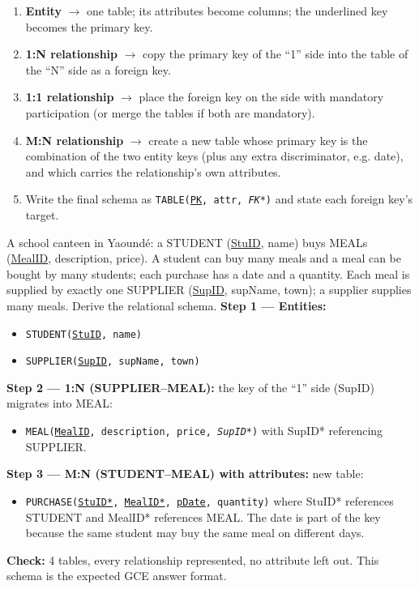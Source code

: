 \documentclass[11pt]{article}
\begin{document}
\begin{methode}
\begin{enumerate}
\item \textbf{Entity} $\rightarrow$ one table; its attributes become columns; the underlined key becomes the primary key.
\item \textbf{1:N relationship} $\rightarrow$ copy the primary key of the ``1'' side into the table of the ``N'' side as a foreign key.
\item \textbf{1:1 relationship} $\rightarrow$ place the foreign key on the side with mandatory participation (or merge the tables if both are mandatory).
\item \textbf{M:N relationship} $\rightarrow$ create a new table whose primary key is the combination of the two entity keys (plus any extra discriminator, e.g. date), and which carries the relationship's own attributes.
\item Write the final schema as \texttt{TABLE(\underline{PK}, attr, \emph{FK*})} and state each foreign key's target.
\end{enumerate}
\end{methode}

\begin{exoresolu}
A school canteen in Yaoundé: a STUDENT (\underline{StuID}, name) buys MEALs (\underline{MealID}, description, price). A student can buy many meals and a meal can be bought by many students; each purchase has a date and a quantity. Each meal is supplied by exactly one SUPPLIER (\underline{SupID}, supName, town); a supplier supplies many meals. Derive the relational schema.
\tcblower
\textbf{Step 1 — Entities:}
\begin{itemize}
\item \texttt{STUDENT(\underline{StuID}, name)}
\item \texttt{SUPPLIER(\underline{SupID}, supName, town)}
\end{itemize}
\textbf{Step 2 — 1:N (SUPPLIER--MEAL):} the key of the ``1'' side (SupID) migrates into MEAL:
\begin{itemize}
\item \texttt{MEAL(\underline{MealID}, description, price, \emph{SupID*})} with SupID* referencing SUPPLIER.
\end{itemize}
\textbf{Step 3 — M:N (STUDENT--MEAL) with attributes:} new table:
\begin{itemize}
\item \texttt{PURCHASE(\underline{StuID*}, \underline{MealID*}, \underline{pDate}, quantity)} where StuID* references STUDENT and MealID* references MEAL. The date is part of the key because the same student may buy the same meal on different days.
\end{itemize}
\textbf{Check:} 4 tables, every relationship represented, no attribute left out. This schema is the expected GCE answer format.
\end{exoresolu}
\end{document}
